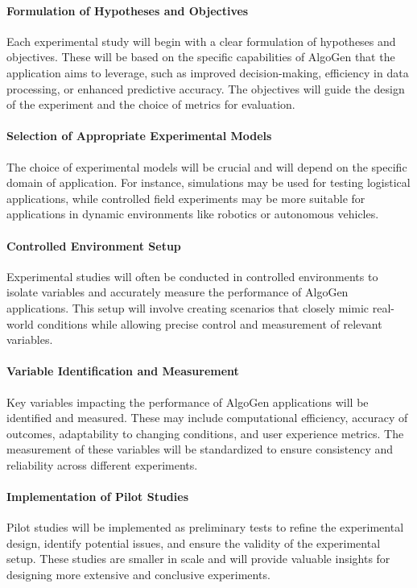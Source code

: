 \documentclass{article}
\begin{document}
\paragraph{Formulation of Hypotheses and Objectives}
Each experimental study will begin with a clear formulation of hypotheses and objectives. These will be based on the specific capabilities of AlgoGen that the application aims to leverage, such as improved decision-making, efficiency in data processing, or enhanced predictive accuracy. The objectives will guide the design of the experiment and the choice of metrics for evaluation.

\paragraph{Selection of Appropriate Experimental Models}
The choice of experimental models will be crucial and will depend on the specific domain of application. For instance, simulations may be used for testing logistical applications, while controlled field experiments may be more suitable for applications in dynamic environments like robotics or autonomous vehicles.

\paragraph{Controlled Environment Setup}
Experimental studies will often be conducted in controlled environments to isolate variables and accurately measure the performance of AlgoGen applications. This setup will involve creating scenarios that closely mimic real-world conditions while allowing precise control and measurement of relevant variables.

\paragraph{Variable Identification and Measurement}
Key variables impacting the performance of AlgoGen applications will be identified and measured. These may include computational efficiency, accuracy of outcomes, adaptability to changing conditions, and user experience metrics. The measurement of these variables will be standardized to ensure consistency and reliability across different experiments.

\paragraph{Implementation of Pilot Studies}
Pilot studies will be implemented as preliminary tests to refine the experimental design, identify potential issues, and ensure the validity of the experimental setup. These studies are smaller in scale and will provide valuable insights for designing more extensive and conclusive experiments.
\end{document}
